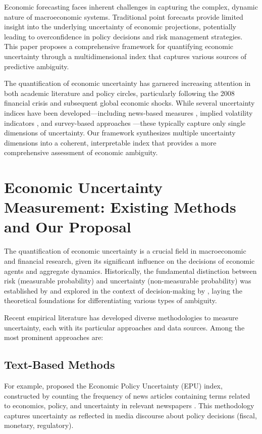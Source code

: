 \documentclass[5p,authoryear]{elsarticle}
\begin{document}
Economic forecasting faces inherent challenges in capturing the complex, dynamic nature of macroeconomic systems. Traditional point forecasts provide limited insight into the underlying uncertainty of economic projections, potentially leading to overconfidence in policy decisions and risk management strategies. This paper proposes a comprehensive framework for quantifying economic uncertainty through a multidimensional index that captures various sources of predictive ambiguity.

The quantification of economic uncertainty has garnered increasing attention in both academic literature and policy circles, particularly following the 2008 financial crisis and subsequent global economic shocks. While several uncertainty indices have been developed—including news-based measures \citep{Baker2016}, implied volatility indicators \citep{Bloom2009}, and survey-based approaches \citep{Rossi2019}—these typically capture only single dimensions of uncertainty. Our framework synthesizes multiple uncertainty dimensions into a coherent, interpretable index that provides a more comprehensive assessment of economic ambiguity.

\section{Economic Uncertainty Measurement: Existing Methods and Our Proposal}

The quantification of economic uncertainty is a crucial field in macroeconomic and financial research, given its significant influence on the decisions of economic agents and aggregate dynamics. Historically, the fundamental distinction between risk (measurable probability) and uncertainty (non-measurable probability) was established by \cite{Knight1921} and explored in the context of decision-making by \cite{Ellsberg1961}, laying the theoretical foundations for differentiating various types of ambiguity.

Recent empirical literature has developed diverse methodologies to measure uncertainty, each with its particular approaches and data sources. Among the most prominent approaches are:

\subsection*{Text-Based Methods}
For example, \cite{baker_epu} proposed the Economic Policy Uncertainty (EPU) index, constructed by counting the frequency of news articles containing terms related to economics, policy, and uncertainty in relevant newspapers \cite{baker_epu}. This methodology captures uncertainty as reflected in media discourse about policy decisions (fiscal, monetary, regulatory).
\end{document}

